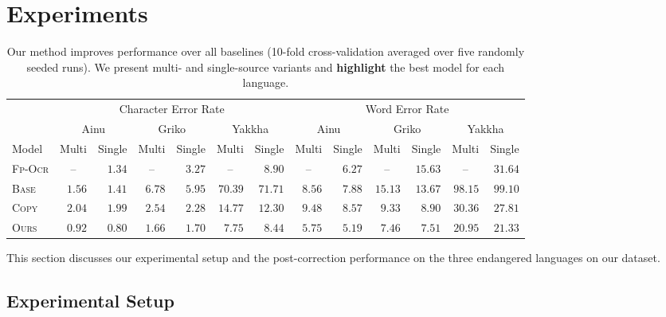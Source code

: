 \section{Experiments}
\label{sec:experiments}
\begin{table}[tb]
    \centering
    \small
    \begin{tabular}{l|r@{\ \ }rr@{\ \ }rr@{\ \ }r|r@{\ \ }rr@{\ \ }rr@{\ \ }r}
    \toprule
        & \multicolumn{6}{c|}{Character Error Rate} &\multicolumn{6}{c}{Word Error Rate} \\
        & \multicolumn{2}{c}{Ainu} & \multicolumn{2}{c}{Griko} & \multicolumn{2}{c|}{Yakkha} & \multicolumn{2}{c}{Ainu} & \multicolumn{2}{c}{Griko} & \multicolumn{2}{c}{Yakkha} \\[-0.3em]
        Model & \small Multi & \small Single & \small Multi & \small Single & \small Multi & \small Single & \small Multi & \small Single & \small Multi & \small Single & \small Multi & \small Single\\
        \midrule
        \textsc{Fp-Ocr} & \multicolumn{1}{c}{--} & $1.34$ & \multicolumn{1}{c}{--} & $3.27$ & \multicolumn{1}{c}{--} & $8.90$ & \multicolumn{1}{c}{--} & $6.27$ & \multicolumn{1}{c}{--} & $15.63$ & \multicolumn{1}{c}{--} & $31.64$ \\
        \textsc{Base} & $1.56$ & $1.41$ & $6.78$ & $5.95$ & $70.39$ & $71.71$ & $8.56$ & $7.88$ & $15.13$ & $13.67$ & $98.15$ & $99.10$  \\
        \textsc{Copy} & $2.04$ & $1.99$ & $2.54$ & $2.28$ & $14.77$ & $12.30$ & $9.48$ & $8.57$ & $9.33$ & $8.90$ & $30.36$ & $27.81$ \\
        \textsc{Ours} & $0.92$ & $\boldsymbol{0.80}$ & $\boldsymbol{1.66}$ & $1.70$ & $\boldsymbol{7.75}$ & $8.44$ & $5.75$ & $\boldsymbol{5.19}$ & $\boldsymbol{7.46}$ & $7.51$ & $\boldsymbol{20.95}$ & $21.33$ \\
    \bottomrule
    \end{tabular}
    \caption{Our method improves performance over all baselines (10-fold cross-validation averaged over five randomly seeded runs). We present multi- and single-source variants and \textbf{highlight} the best model for each language.}
    \label{tab:cer}
\end{table}

This section discusses our experimental setup and the post-correction performance on the three endangered languages on our dataset.

\subsection{Experimental Setup}
\smallskip

